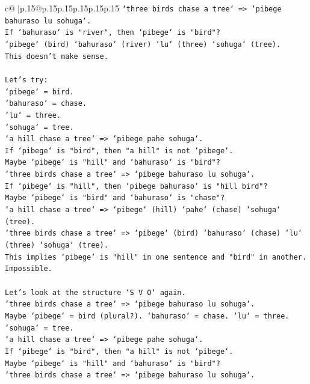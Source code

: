 \documentclass{article}
\begin{document}
{\begin{supertabular}{c@{$\;$}|p{.15\linewidth}@{}p{.15\linewidth}p{.15\linewidth}p{.15\linewidth}p{.15\linewidth}p{.15\linewidth}}
{{{\texttt{`three birds chase a tree` => `pibege bahuraso lu sohuga`.} \\
\texttt{If `bahuraso` is "river", then `pibege` is "bird"?} \\
\texttt{`pibege` (bird) `bahuraso` (river) `lu` (three) `sohuga` (tree).} \\
\texttt{This doesn't make sense.} \\
\\ 
\texttt{Let's try:} \\
\texttt{`pibege` = bird.} \\
\texttt{`bahuraso` = chase.} \\
\texttt{`lu` = three.} \\
\texttt{`sohuga` = tree.} \\
\texttt{`a hill chase a tree` => `pibege pahe sohuga`.} \\
\texttt{If `pibege` is "bird", then "a hill" is not `pibege`.} \\
\texttt{Maybe `pibege` is "hill" and `bahuraso` is "bird"?} \\
\texttt{`three birds chase a tree` => `pibege bahuraso lu sohuga`.} \\
\texttt{If `pibege` is "hill", then `pibege bahuraso` is "hill bird"?} \\
\texttt{Maybe `pibege` is "bird" and `bahuraso` is "chase"?} \\
\texttt{`a hill chase a tree` => `pibege` (hill) `pahe` (chase) `sohuga` (tree).} \\
\texttt{`three birds chase a tree` => `pibege` (bird) `bahuraso` (chase) `lu` (three) `sohuga` (tree).} \\
\texttt{This implies `pibege` is "hill" in one sentence and "bird" in another. Impossible.} \\
\\ 
\texttt{Let's look at the structure `S V O` again.} \\
\texttt{`three birds chase a tree` => `pibege bahuraso lu sohuga`.} \\
\texttt{Maybe `pibege` = bird (plural?). `bahuraso` = chase. `lu` = three. `sohuga` = tree.} \\
\texttt{`a hill chase a tree` => `pibege pahe sohuga`.} \\
\texttt{If `pibege` is "bird", then "a hill" is not `pibege`.} \\
\texttt{Maybe `pibege` is "hill" and `bahuraso` is "bird"?} \\
\texttt{`three birds chase a tree` => `pibege bahuraso lu sohuga`.} \\
}}}
\end{supertabular}}
\end{document}
